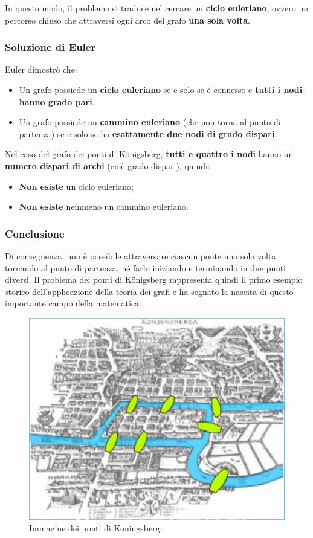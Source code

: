 In questo modo, il problema si traduce nel cercare un \textbf{ciclo euleriano}, ovvero un percorso chiuso che attraversi ogni arco del grafo \textbf{una sola volta}.

\subsubsection*{Soluzione di Euler}

Euler dimostrò che:
\begin{itemize}
    \item Un grafo possiede un \textbf{ciclo euleriano} se e solo se è connesso e \textbf{tutti i nodi hanno grado pari}.
    \item Un grafo possiede un \textbf{cammino euleriano} (che non torna al punto di partenza) se e solo se ha \textbf{esattamente due nodi di grado dispari}.
\end{itemize}

Nel caso del grafo dei ponti di Königsberg, \textbf{tutti e quattro i nodi} hanno un \textbf{numero dispari di archi} (cioè grado dispari), quindi:
\begin{itemize}
    \item \textbf{Non esiste} un ciclo euleriano;
    \item \textbf{Non esiste} nemmeno un cammino euleriano.
\end{itemize}

\subsubsection*{Conclusione}

Di conseguenza, non è possibile attraversare ciascun ponte una sola volta tornando al punto di partenza, né farlo iniziando e terminando in due punti diversi. Il problema dei ponti di Königsberg rappresenta quindi il primo esempio storico dell'applicazione della teoria dei grafi e ha segnato la nascita di questo importante campo della matematica.
\newpage
\begin{figure}[th]
    \centering
    \includegraphics[scale=0.5]{Introduction/img/pontiKoningsberg.png}
    \caption{Immagine dei ponti di Koningsberg.}
\end{figure}
\newpage
